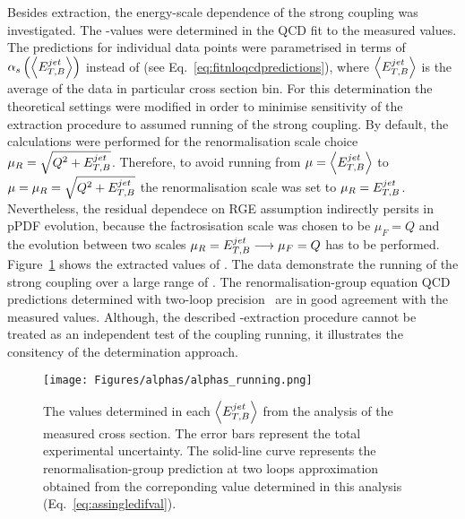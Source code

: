Besides \asz extraction, the energy-scale dependence of the strong coupling was investigated. The \as-values were determined in the QCD fit to the measured \dsdetjetb values. The predictions for individual \dsdetjetb data points were parametrised in terms of $\mbox{$\alpha_{s}$}\left(\left<\mbox{$E_{T,B}^{jet}$}\right>\right)$ instead of \asz (see Eq.~\eqref{eq:fitnloqcdpredictions}), where $\left<\mbox{$E_{T,B}^{jet}$}\right>$ is the average \etjetb of the data in particular cross section bin. For this determination the theoretical settings were modified in order to minimise sensitivity of the extraction procedure to assumed running of the strong coupling. By default, the calculations were performed for the renormalisation scale choice $\mu_R=\sqrt{\mbox{${Q^2}$}+\mbox{$E_{T,B}^{jet}$}}$. Therefore, to avoid running from $\mu=\left<\mbox{$E_{T,B}^{jet}$}\right>$ to $\mu=\mu_R=\sqrt{\mbox{${Q^2}$}+\mbox{$E_{T,B}^{jet}$}}$ the renormalisation scale was set to $\mu_R=\mbox{$E_{T,B}^{jet}$}$. Nevertheless, the residual dependece on RGE assumption indirectly persits in pPDF evolution, because the factrosisation scale was chosen to be $\mu_F=Q$ and the evolution between two scales $\mu_R = \mbox{$E_{T,B}^{jet}$} \longrightarrow \mu_F = Q$ has to be performed. Figure~\ref{fig:asrunning} shows the extracted values of \as. The data demonstrate the running of the strong coupling over a large range of \etjetb. The renormalisation-group equation QCD predictions determined with two-loop precision~\cite{Gross:1973id, Politzer:1973fx, Gross:1973ju, Politzer:1974fr} are in good agreement with the measured values. Although, the described \as-extraction procedure cannot be treated as an independent test of the coupling running, it illustrates the consitency of the \as determination approach.

\begin{figure}[t]
 \centering
 \texttt{[image: Figures/alphas/alphas\_running.png]}
 \caption{The \as values determined in each $\left<\mbox{$E_{T,B}^{jet}$}\right>$ from the analysis of the measured \dsdetjetb cross section. The error bars represent the total experimental uncertainty. The solid-line curve represents the renormalisation-group prediction at two loops approximation obtained from the correponding \asz value determined in this analysis (Eq.~\eqref{eq:assingledifval}).}
 \label{fig:asrunning}
\end{figure}



